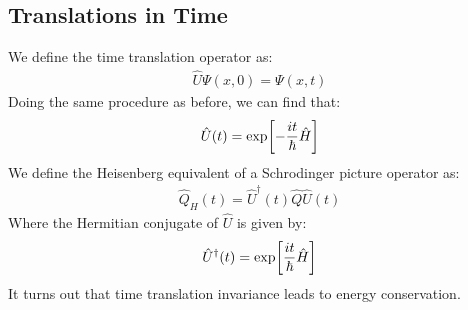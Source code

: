 \subsection{Translations in Time}
We define the time translation operator as:
\begin{align*}
  \hat{U}\Psi(x,0)=\Psi(x,t)
\end{align*}
Doing the same procedure as before, we can find that:
\begin{align*}
  \hat{U}(t)=\mathrm{exp}\qty[-\dfrac{it}{\hbar}\hat{H}]
\end{align*}
We define the Heisenberg equivalent of a Schrodinger picture operator as:
\begin{align*}
  \hat{Q}_H(t)=\hat{U}^\dag(t)\hat{Q}\hat{U}(t)
\end{align*}
Where the Hermitian conjugate of $\hat{U}$ is given by:
\begin{align*}
  \hat{U}^\dag(t)=\mathrm{exp}\qty[\dfrac{it}{\hbar}\hat{H}]
\end{align*}
It turns out that time translation invariance leads to energy conservation.